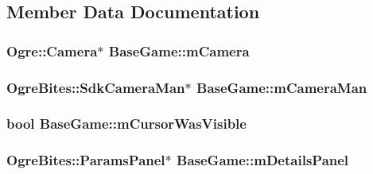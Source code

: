 \subsection{Member Data Documentation}
\hypertarget{classBaseGame_ad3c279cdf94f77cd1652ad142a498a04}{
\subsubsection[{m\-Camera}]{\setlength{\rightskip}{0pt plus 5cm}Ogre\-::\-Camera$\ast$ Base\-Game\-::m\-Camera\hspace{0.3cm}{\ttfamily [protected]}}}\label{classBaseGame_ad3c279cdf94f77cd1652ad142a498a04}
\hypertarget{classBaseGame_a7263f984ab72533f785c1db9f0bc447e}{
\subsubsection[{m\-Camera\-Man}]{\setlength{\rightskip}{0pt plus 5cm}Ogre\-Bites\-::\-Sdk\-Camera\-Man$\ast$ Base\-Game\-::m\-Camera\-Man\hspace{0.3cm}{\ttfamily [protected]}}}\label{classBaseGame_a7263f984ab72533f785c1db9f0bc447e}
\hypertarget{classBaseGame_a1c4ba8734fb3fee6254afc155062d59c}{
\subsubsection[{m\-Cursor\-Was\-Visible}]{\setlength{\rightskip}{0pt plus 5cm}bool Base\-Game\-::m\-Cursor\-Was\-Visible\hspace{0.3cm}{\ttfamily [protected]}}}\label{classBaseGame_a1c4ba8734fb3fee6254afc155062d59c}
\hypertarget{classBaseGame_ac68de06a1542fc8d4c67ade85a1753c1}{
\subsubsection[{m\-Details\-Panel}]{\setlength{\rightskip}{0pt plus 5cm}Ogre\-Bites\-::\-Params\-Panel$\ast$ Base\-Game\-::m\-Details\-Panel\hspace{0.3cm}{\ttfamily [protected]}}}\label{classBaseGame_ac68de06a1542fc8d4c67ade85a1753c1}

